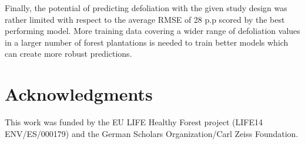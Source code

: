 \documentclass[final]{IEEEtran}
\begin{document}
Finally, the potential of predicting defoliation with the given study design was rather limited with respect to the average RMSE of 28 p.p scored by the best performing model.
More training data covering a wider range of defoliation values in a larger number of forest plantations is needed to train better models which can create more robust predictions.

\section{Acknowledgments}
This work was funded by the EU LIFE Healthy Forest project (LIFE14 ENV/ES/000179) and the German Scholars Organization/Carl Zeiss Foundation.

\appendices{}





\pagebreak
\section{}
\end{document}
